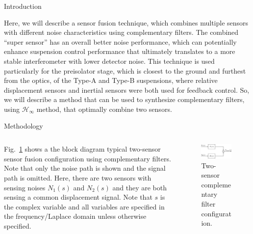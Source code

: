 \documentclass{beamer}
\begin{document}
\begin{frame}[t]
\begin{columns}[t]
\begin{column}{0.32\linewidth}
\begin{block}{Introduction}
				\medskip
				
				Here, we will describe a sensor fusion technique, which combines multiple sensors with different noise characteristics using complementary filters.
				The combined ``super sensor'' has an overall better noise performance, which can potentially enhance suspension control performance that ultimately translates to a more stable interferometer with lower detector noise.
				This technique is used particularly for the preisolator stage, which is closest to the ground and furthest from the optics, of the Type-A and Type-B suspensions, where relative displacement sensors and inertial sensors were both used for feedback control.
				So, we will describe a method that can be used to synthesize complementary filters, using $\mathcal{H}_\infty$ method, that optimally combine two sensors.
			\end{block}
				
			\begin{block}{Methodology}
				\begin{columns}[t, onlytextwidth]
					\begin{column}{0.5\textwidth}
						Fig.~\ref{fig:two-sensor} shows a the block diagram typical two-sensor sensor fusion configuration using complementary filters.
						Note that only the noise path is shown and the signal path is omitted.
						Here, there are two sensors with sensing noises $N_1(s)$ and $N_2(s)$ and they are both sensing a common displacement signal.
						Note that $s$ is the complex variable and all variables are specified in the frequency/Laplace domain unless otherwise specified.
					\end{column}
					\begin{column}{0.5\textwidth}
						\begin{figure}
							\centering
							\includegraphics[width=1\linewidth]{complementary_filter}
							\caption{Two-sensor complementary filter configuration.}
							\label{fig:two-sensor}
						\end{figure}
					\end{column}
				\end{columns}
			

\end{block}
\end{column}
\end{columns}
\end{frame}
\end{document}
